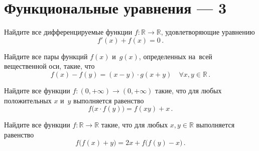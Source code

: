 
\section*{Функциональные уравнения --- 3}



\begin{problems}

\item
Найдите все дифференцируемые функции $f \colon \mathbb{R} \to \mathbb{R}$,
удовлетворяющие уравнению
\[
    f'(x) + f(x) = 0
\,.\]

\item
Найдите все пары функций $f(x)$ и~$g(x)$, определенных на~всей вещественной
оси, такие, что
\[
    f(x) - f(y)
=
    (x - y) \cdot g(x + y)
\quad
    \forall x, y \in \mathbb{R}
\,.\]

\item
Найдите все функции $f \colon (0, +\infty ) \to (0, +\infty)$ такие, что для 
любых положительных $x$ и~$y$ выполняется равенство 
\[
    f \bigl( x \cdot f(y) \bigr)
=
    f(x y) + x
\,.\]

\item
Найдите все функции $f \colon \mathbb{R} \to \mathbb{R}$ такие, что для любых
$x, y \in \mathbb{R}$ выполняется равенство
\[
    f \bigl( f(x) + y \bigr)
=
    2 x + f \bigl( f(y) - x \bigr)
\,.\]

\end{problems}

